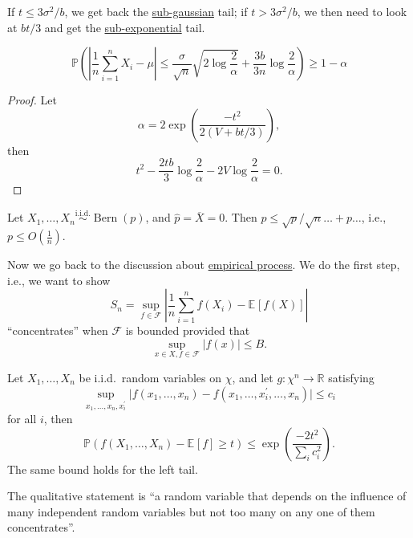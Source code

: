 \begin{remark}
	If \(t \leq 3 \sigma ^{2} / b\), we get back the \hyperref[def:sub-gaussian]{sub-gaussian} tail; if \(t > 3\sigma ^{2} / b\), we then need to look at \(bt / 3\) and get the \hyperref[def:sub-exponential]{sub-exponential} tail.
\end{remark}

\begin{proposition}
	\[
		\mathbb{P} \left( \left\vert \frac{1}{n} \sum_{i=1}^{n} X_i - \mu  \right\vert \leq \frac{\sigma}{\sqrt{n} } \sqrt{2 \log \frac{2}{\alpha }} + \frac{3b}{3n} \log \frac{2}{\alpha } \right) \geq 1 - \alpha
	\]
\end{proposition}
\begin{proof}
	Let
	\[
		\alpha = 2 \exp \left( \frac{- t^2}{2(V + bt / 3)} \right),
	\]
	then
	\[
		t^2 - \frac{2tb}{3}\log \frac{2}{\alpha } - 2 V \log \frac{2}{\alpha } = 0.
	\]
\end{proof}

\begin{eg}
	Let \(X_1 , \dots , X_n \overset{\text{i.i.d.} }{\sim } \mathop{\mathrm{Bern}}(p) \), and \(\hat{p} = \overline{X} = 0\). Then \(p \leq \sqrt{p} / \sqrt{n} \dots + p \dots  \), i.e., \(p \leq O(\frac{1}{n})\).
\end{eg}

Now we go back to the discussion about \hyperref[def:EP]{empirical process}. We do the first step, i.e., we want to show
\[
	S_n = \sup _{f \in \mathscr{F} } \left\vert \frac{1}{n}\sum_{i=1}^{n} f(X_i) - \mathbb{E}_{}\left[f(X) \right]  \right\vert
\]
``concentrates'' when \(\mathscr{F} \) is bounded provided that
\[
	\sup _{x\in X, f\in \mathscr{F} } \vert f(x) \vert \leq B.
\]

\begin{theorem}\label{thm:bounded-difference-concentration-inequality}
	Let \(X_1, \dots , X_n\) be i.i.d.\ random variables on \(\chi \), and let \(g\colon \chi ^n \to \mathbb{R} \) satisfying
	\[
		\sup _{x_1, \dots , x_n, x_i^{\prime} }\vert f(x_1, \dots , x_n) - f(x_1, \dots , x_i^{\prime} , \dots , x_n) \vert \leq c_i
	\]
	for all \(i\), then
	\[
		\mathbb{P} (f(X_1, \dots , X_n) - \mathbb{E}_{}\left[f \right] \geq t) \leq \exp \left( \frac{-2t^2}{\sum_{i} c_i^2} \right).
	\]
	The same bound holds for the left tail.
\end{theorem}

\begin{remark}
	The qualitative statement is ``a random variable that depends on the influence of many independent random variables but not too many on any one of them concentrates''.
\end{remark}

